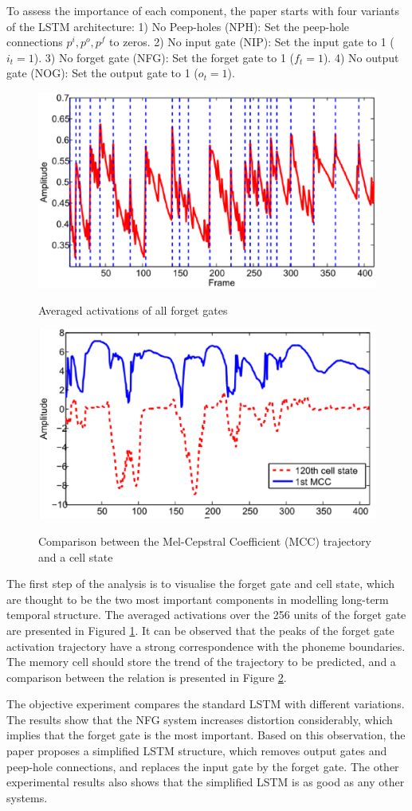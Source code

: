 \documentclass[paper=a4, fontsize=18pt]{article} %
\numberwithin{equation}{section} %
\numberwithin{figure}{section} %
\numberwithin{table}{section} %
\begin{document}
To assess the importance of each component, the paper starts with four variants of the LSTM architecture: 1) No Peep-holes (NPH): Set the peep-hole connections $p^i, p^o, p^f$ to zeros. 2) No input gate (NIP): Set the input gate to 1 ($i_t = 1$). 3) No forget gate (NFG): Set the forget gate to 1 ($f_t = 1$). 4) No output gate (NOG):  Set the output gate to 1 ($o_t = 1$).

\begin{figure}[htbp]
  \centering
  \includegraphics[width=.5\linewidth]{10_3_acu1}\\
  \caption{Averaged activations of all forget gates}\label{fig:acu1}
\end{figure}

\begin{figure}[htbp]
  \centering
  \includegraphics[width=.5\linewidth]{10_3_acu2}\\
  \caption{Comparison between the Mel-Cepstral Coefficient (MCC) trajectory and a cell state}\label{fig:acu2}
\end{figure}

The first step of the analysis is to visualise the forget gate and cell state, which are thought to be the two most important components in modelling long-term temporal structure. The averaged activations over the 256 units of the forget gate are presented in Figured \ref{fig:acu1}. It can be observed that the peaks of the forget gate activation trajectory have a strong correspondence with the phoneme boundaries. The memory cell should store the trend of the trajectory to be predicted, and a comparison between the relation is presented in Figure \ref{fig:acu2}.

The objective experiment compares the standard LSTM with different variations. The results show that the NFG system increases distortion considerably, which implies that the forget gate is the most important. Based on this observation, the paper proposes a simplified LSTM structure, which removes output gates and peep-hole connections, and replaces the input gate by the forget gate. The other experimental results also shows that the simplified LSTM is as good as any other systems.
\end{document}
